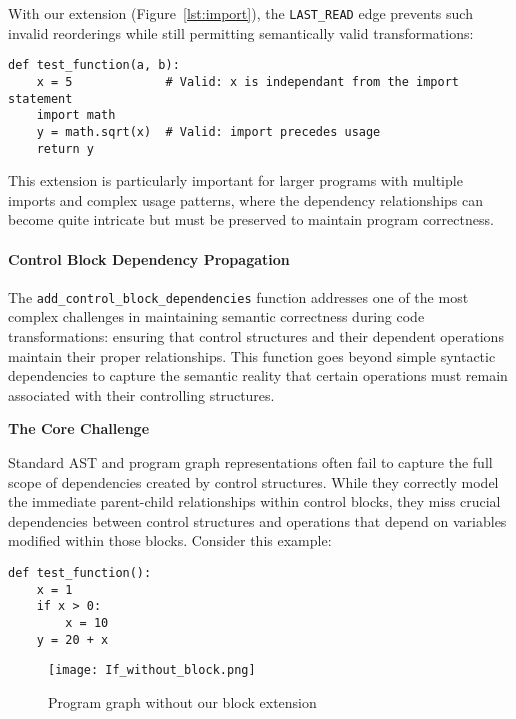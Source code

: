 \documentclass[%
thesis=student,%
coverpage=false,%
titlepage=false,%
headmarks=true, %
english,%
font=libertine, %
math=newpxtx, %
BCOR=5mm,%
coverBCOR=11mm%
]{tum-templates/book/tumbook}
\begin{document}
With our extension (Figure~\ref{lst:import}), the \texttt{LAST\_READ} edge prevents such invalid reorderings while still permitting semantically valid transformations:

\begin{lstlisting}[style=pythonstyle, caption={Import dependency considerated}]
def test_function(a, b):
    x = 5             # Valid: x is independant from the import statement
    import math
    y = math.sqrt(x)  # Valid: import precedes usage
    return y
\end{lstlisting}

This extension is particularly important for larger programs with multiple imports and complex usage patterns, where the dependency relationships can become quite intricate but must be preserved to maintain program correctness.


\paragraph{Control Block Dependency Propagation}

The \texttt{add\_control\_block\_dependencies} function addresses one of the most complex challenges in maintaining semantic correctness during code transformations: ensuring that control structures and their dependent operations maintain their proper relationships. This function goes beyond simple syntactic dependencies to capture the semantic reality that certain operations must remain associated with their controlling structures.

\textbf{The Core Challenge}

Standard AST and program graph representations often fail to capture the full scope of dependencies created by control structures. While they correctly model the immediate parent-child relationships within control blocks, they miss crucial dependencies between control structures and operations that depend on variables modified within those blocks. Consider this example:

\begin{lstlisting}[style=pythonstyle, caption={A control block (if) with dependencies outside the control block}]
def test_function():
    x = 1
    if x > 0:
        x = 10
    y = 20 + x
\end{lstlisting}    

\begin{figure}[htbp]
    \centering
    \texttt{[image: If\_without\_block.png]}
    \caption{Program graph without our block extension}
    \label{fig:If_without_block}
\end{figure}
\end{document}
